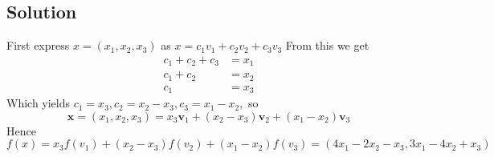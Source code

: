 \documentclass{article}[18pt]
\begin{document}
\subsection{Solution}
First express $x=(x_1,x_2,x_3)$ as $x=c_1v_1+c_2v_2+c_3v_3$ From this we get
$$\begin{aligned} c _ { 1 } + c _ { 2 } + c _ { 3 } & = x _ { 1 } \\ c _ { 1 } + c _ { 2 } & = x _ { 2 } \\ c _ { 1 } & = x _ { 3 } \end{aligned}$$
Which yields  $c _ { 1 } = x _ { 3 } , c _ { 2 } = x _ { 2 } - x _ { 3 } , c _ { 3 } = x _ { 1 } - x _ { 2 } ,$ so
$$\mathbf { x } = \left( x _ { 1 } , x _ { 2 } , x _ { 3 } \right) = x _ { 3 } \mathbf { v } _ { 1 } + \left( x _ { 2 } - x _ { 3 } \right) \mathbf { v } _ { 2 } + \left( x _ { 1 } - x _ { 2 } \right) \mathbf { v } _ { 3 }$$
Hence
$$f ( x ) = x _ { 3 } f \left( v _ { 1 } \right) + \left( x _ { 2 } - x _ { 3 } \right) f \left( v _ { 2 } \right) + \left( x _ { 1 } - x _ { 2 } \right) f \left( v _ { 3 } \right) = \left( 4 x _ { 1 } - 2 x _ { 2 } - x _ { 3 } , 3 x _ { 1 } - 4 x _ { 2 } + x _ { 3 } \right)$$
\end{document}
